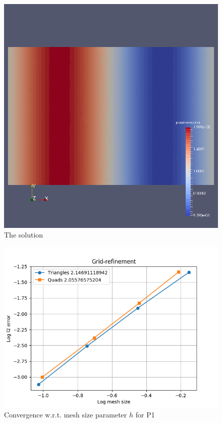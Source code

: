 \documentclass[11pt]{article}
\begin{document}
\begin{figure}
	\centering
	\includegraphics[scale=0.3]{solution-steady-linadv}
	\caption{The solution}
\end{figure}
\begin{figure}
	\centering
	\includegraphics[scale=0.7]{linadv-taylor-p1}
	\caption{Convergence w.r.t. mesh size parameter $h$ for P1}
\end{figure}
\end{document}
